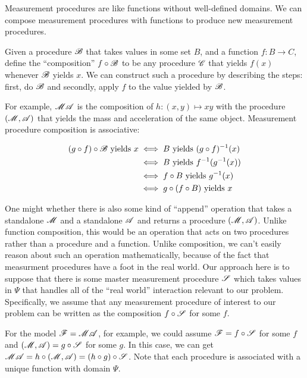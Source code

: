 Measurement procedures are like functions without well-defined domains. We can compose measurement procedures with functions to produce new measurement procedures.

\begin{definition}
Given a procedure $\mathscr{B}$ that takes values in some set $B$, and a function $f:B\to C$, define the ``composition'' $f\circ \mathscr{B}$ to be any procedure $\mathscr{C}$ that yields $f(x)$ whenever $\mathscr{B}$ yields $x$. We can construct such a procedure by describing the steps: first, do $\mathscr{B}$ and secondly, apply $f$ to the value yielded by $\mathscr{B}$.
\end{definition}

For example, $\mathscr{MA}$ is the composition of $h:(x,y)\mapsto xy$ with the procedure $(\mathscr{M},\mathscr{A})$ that yields the mass and acceleration of the same object. Measurement procedure composition is associative:

\begin{align}
	(g\circ f)\circ\mathscr{B}\text{ yields } x &\iff B\text{ yields } (g\circ f)^{-1}(x) \\
	&\iff B\text{ yields } f^{-1}(g^{-1}(x))\\
	&\iff f\circ B \text{ yields } g^{-1}(x)\\
	&\iff g\circ(f\circ B)\text{ yields } x
\end{align}


One might whether there is also some kind of ``append'' operation that takes a standalone $\mathscr{M}$ and a standalone $\mathscr{A}$ and returns a procedure $(\mathscr{M},\mathscr{A})$. Unlike function composition, this would be an operation that acts on two procedures rather than a procedure and a function. Unlike composition, we can't easily reason about such an operation mathematically, because of the fact that measurment procedures have a foot in the real world. Our approach here is to suppose that there is some master measurement procedure $\mathscr{S}$ which takes values in $\Psi$ that handles all of the ``real world'' interaction relevant to our problem. Specifically, we assume that any measurement procedure of interest to our problem can be written as the composition $f\circ \mathscr{S}$ for some $f$.

For the model $\mathscr{F}=\mathscr{MA}$, for example, we could assume $\mathscr{F}=f\circ \mathscr{S}$ for some $f$ and $(\mathscr{M},\mathscr{A})=g\circ \mathscr{S}$ for some $g$. In this case, we can get $\mathscr{MA}=h\circ(\mathscr{M},\mathscr{A})=(h\circ g)\circ\mathscr{S}$. Note that each procedure is associated with a unique function with domain $\Psi$.

